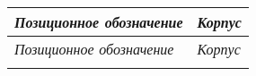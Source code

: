 \documentclass[a4paper,russian,utf8]{eskdgraph}
\begin{document}
\renewcommand{\tablename}{}
\setlength{\extrarowheight}{0,24cm} 
  \newcommand{\ltheadEquipment}{}
  \renewcommand{\ltheadEquipment}
    {
    \hline    
    \multicolumn{1}{m{10cm}|}{\centering   \textit{Позиционное обозначение}}&
    \multicolumn{1}{m{3mm}}{\centering   \textit{Корпус}}\\
    \hline
    }    

\begin{longtable} {m{10cm}|m{3cm}}

\caption{}
\label{tab:psitible}

\\
    \ltheadEquipment
    \endfirsthead 
    \ltheadEquipment
    \endhead
    \endfoot
    \endlastfoot



\end{longtable}
\end{document}
